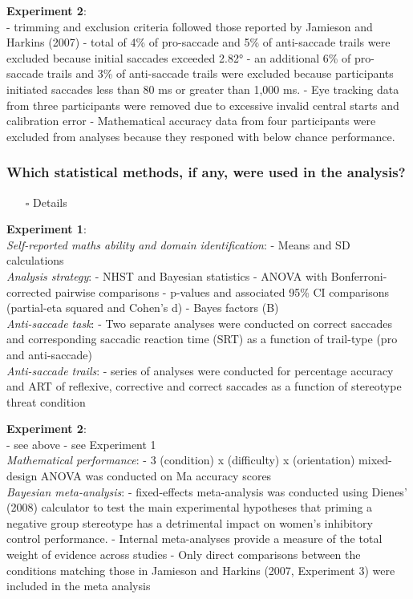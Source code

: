 \documentclass[
  doc, a4paper]{apa7}
\providecommand{\tightlist}{%
  \setlength{\itemsep}{0pt}\setlength{\parskip}{0pt}}
\begin{document}
\textbf{Experiment 2}:\\
- trimming and exclusion criteria followed those reported by Jamieson and Harkins (2007)
- total of 4\% of pro-saccade and 5\% of anti-saccade trails were excluded because initial saccades exceeded 2.82°
- an additional 6\% of pro-saccade trails and 3\% of anti-saccade trails were excluded because participants initiated saccades less than 80 ms or greater than 1,000 ms.
- Eye tracking data from three participants were removed due to excessive invalid central starts and calibration error
- Mathematical accuracy data from four participants were excluded from analyses because they responed with below chance performance.

\subsubsection{Which statistical methods, if any, were used in the analysis?}\label{which-statistical-methods-if-any-were-used-in-the-analysis}

\begin{itemize}
\tightlist
\item[$\square$]
  Details
\end{itemize}

\textbf{Experiment 1}:\\
\emph{Self-reported maths ability and domain identification}:
- Means and SD calculations\\
\emph{Analysis strategy}:
- NHST and Bayesian statistics
- ANOVA with Bonferroni-corrected pairwise comparisons
- p-values and associated 95\% CI comparisons (partial-eta squared and Cohen's d)
- Bayes factors (B)\\
\emph{Anti-saccade task}:
- Two separate analyses were conducted on correct saccades and corresponding saccadic reaction time (SRT) as a function of trail-type (pro and anti-saccade)\\
\emph{Anti-saccade trails}:
- series of analyses were conducted for percentage accuracy and ART of reflexive, corrective and correct saccades as a function of stereotype threat condition

\textbf{Experiment 2}:\\
- see above
- see Experiment 1\\
\emph{Mathematical performance}:
- 3 (condition) x (difficulty) x (orientation) mixed-design ANOVA was conducted on Ma accuracy scores\\
\emph{Bayesian meta-analysis}:
- fixed-effects meta-analysis was conducted using Dienes' (2008) calculator to test the main experimental hypotheses that priming a negative group stereotype has a detrimental impact on women's inhibitory control performance.
- Internal meta-analyses provide a measure of the total weight of evidence across studies
- Only direct comparisons between the conditions matching those in Jamieson and Harkins (2007, Experiment 3) were included in the meta analysis
\end{document}
